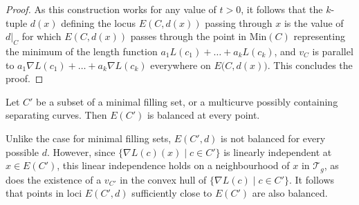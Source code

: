 \begin{proof}
As this construction works for any value of $t>0$, it follows that the $k$-tuple $d(x)$ defining the locus $E(C,d(x))$ passing through $x$ is the value of $d|_{C}$ for which $E(C, d(x))$ passes through the point in $\mathrm{Min}(C)$ representing the minimum of the length function $a_{1}L(c_{1})+\dots+a_{k} L(c_{k})$, and $v_{C}$ is parallel to $a_{1}\nabla L(c_{1})+\dots+a_{k}\nabla L(c_{k})$ everywhere on $E\big(C,d(x)\big)$. This concludes the proof.
\end{proof}

\begin{Proposition}
\label{balancedlemnonfilling}
Let $C'$ be a subset of a minimal filling set, or a multicurve possibly containing separating curves. Then $E(C')$ is balanced at every point.
\end{Proposition}

\begin{Remark}
\label{balancednearby}
Unlike the case for minimal filling sets, $E(C',d)$ is not balanced for every possible $d$. However, since $\{\nabla L(c)(x) \mid c\in C'\}$ is linearly independent at $x\in E(C')$, this linear independence holds on a neighbourhood of $x$ in $\mathcal{T}_{g}$, as does the existence of a $v_{C'}$ in the convex hull of $\{\nabla L(c) \mid c\in C'\}$. It follows that points in loci $E(C',d)$ sufficiently close to $E(C')$ are also balanced.
\end{Remark}

